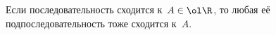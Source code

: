
Если последовательность сходится к~$A\in\ol\R$, то любая её подпоследовательность тоже сходится к~$A$.
